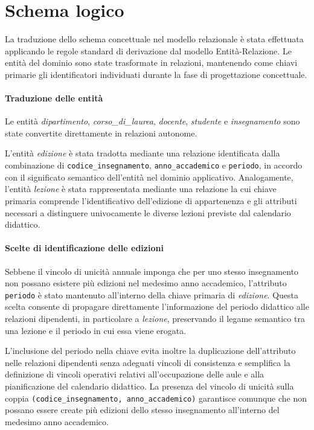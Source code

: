 \section{Schema logico}
\label{sec:schema-logico}

La traduzione dello schema concettuale nel modello relazionale è stata effettuata applicando le regole standard di derivazione dal modello Entità-Relazione.
Le entità del dominio sono state trasformate in relazioni, mantenendo come chiavi primarie gli identificatori individuati durante la fase di progettazione concettuale.

\paragraph{Traduzione delle entità}
Le entità \textit{dipartimento}, \textit{corso\_di\_laurea}, \textit{docente}, \textit{studente} e \textit{insegnamento} sono state convertite direttamente in relazioni autonome.

L'entità \textit{edizione} è stata tradotta mediante una relazione identificata dalla combinazione di \texttt{codice\_insegnamento}, \texttt{anno\_accademico} e \texttt{periodo}, in accordo con il significato semantico dell'entità nel dominio applicativo. Analogamente, l'entità \textit{lezione} è stata rappresentata mediante una relazione la cui chiave primaria comprende l'identificativo dell'edizione di appartenenza e gli attributi necessari a distinguere univocamente le diverse lezioni previste dal calendario didattico.

\paragraph{Scelte di identificazione delle edizioni}

Sebbene il vincolo di unicità annuale imponga che per uno stesso insegnamento non possano esistere più edizioni nel medesimo anno accademico, l'attributo \texttt{periodo} è stato mantenuto all'interno della chiave primaria di \textit{edizione}. Questa scelta consente di propagare direttamente l'informazione del periodo didattico alle relazioni dipendenti, in particolare a \textit{lezione}, preservando il legame semantico tra una lezione e il periodo in cui essa viene erogata.

L'inclusione del periodo nella chiave evita inoltre la duplicazione dell'attributo nelle relazioni dipendenti senza adeguati vincoli di consistenza e semplifica la definizione di vincoli operativi relativi all'occupazione delle aule e alla pianificazione del calendario didattico. La presenza del vincolo di unicità sulla coppia \texttt{(codice\_insegnamento, anno\_accademico)} garantisce comunque che non possano essere create più edizioni dello stesso insegnamento all'interno del medesimo anno accademico.

